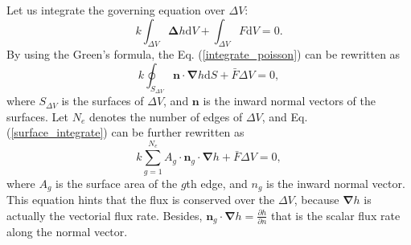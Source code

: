 \documentclass{article}        %
\begin{document}
Let us integrate the governing equation over $\Delta V$:
\begin{equation}
k \int_{\Delta V}\bm{\Delta} h \mathrm{d}V + \int_{\Delta V}F \mathrm{d}V = 0.
\label{integrate_poisson}
\end{equation}
By using the Green's formula, the Eq. (\ref{integrate_poisson}) can be rewritten as
\begin{equation}
k\oint_{S_{\Delta V}} \bm{n}\cdot \bm{\nabla} h \mathrm{d}S + \bar{F}{\Delta V} = 0,
\label{surface_integrate}
\end{equation}
where $S_{\Delta V}$ is the surfaces of $\Delta V$, and $\bm{n}$ is the inward normal vectors of the surfaces. Let $N_e$ denotes the number of edges of $\Delta V$, and Eq. (\ref{surface_integrate}) can be further rewritten as
\begin{equation}
k\sum_{g = 1}^{N_e}A_g\cdot \bm{n}_g \cdot \bm{\nabla}h + \bar{F}{\Delta V} = 0,
\label{sum_flux}
\end{equation} 
where $A_g$ is the surface area of the $g$th edge, and $n_g$ is the inward normal vector. This equation hints that the flux is conserved over the $\Delta V$, because $\bm{\nabla}h$ is actually the vectorial flux rate. Besides, $\bm{n}_g \cdot \bm{\nabla}h = \frac{\partial h}{\partial n}$ that is the scalar flux rate along the normal vector. 
\end{document}
